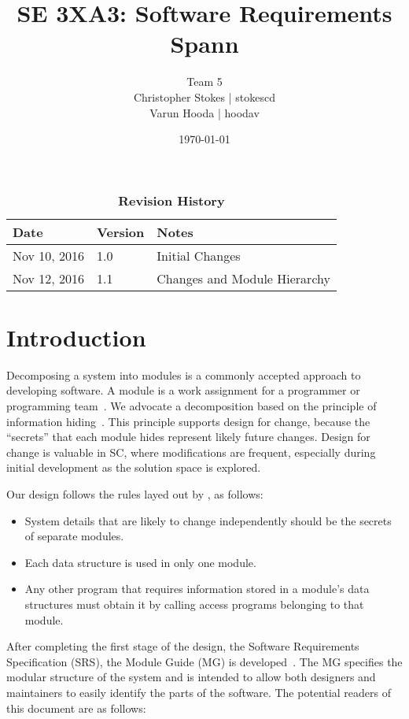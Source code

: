 \documentclass[12pt, titlepage]{article}
\title{SE 3XA3: Software Requirements\\Spann}
\author{Team 5
		\\ Christopher Stokes | stokescd
		\\ Varun Hooda | hoodav
}
\date{\today}
\begin{document}
\maketitle

\tableofcontents
\listoftables
\listoffigures

\begin{table}[bp]
\caption{\bf Revision History}
\begin{tabularx}{\textwidth}{p{3cm}p{2cm}X}
\toprule {\bf Date} & {\bf Version} & {\bf Notes}\\
\midrule
  Nov 10, 2016 & 1.0 & Initial Changes\\
  Nov 12, 2016 & 1.1 & Changes and Module Hierarchy\\
\bottomrule
\end{tabularx}
\end{table}

\newpage


\section{Introduction}

Decomposing a system into modules is a commonly accepted approach to developing
software.  A module is a work assignment for a programmer or programming
team~\citep{ParnasEtAl1984}.  We advocate a decomposition
based on the principle of information hiding~\citep{Parnas1972a}.  This
principle supports design for change, because the ``secrets'' that each module
hides represent likely future changes.  Design for change is valuable in SC,
where modifications are frequent, especially during initial development as the
solution space is explored.

Our design follows the rules layed out by \citet{ParnasEtAl1984}, as follows:
\begin{itemize}
\item System details that are likely to change independently should be the
  secrets of separate modules.
\item Each data structure is used in only one module.
\item Any other program that requires information stored in a module's data
  structures must obtain it by calling access programs belonging to that module.
\end{itemize}

After completing the first stage of the design, the Software Requirements
Specification (SRS), the Module Guide (MG) is developed~\citep{ParnasEtAl1984}. The MG
specifies the modular structure of the system and is intended to allow both
designers and maintainers to easily identify the parts of the software.  The
potential readers of this document are as follows:
\end{document}
